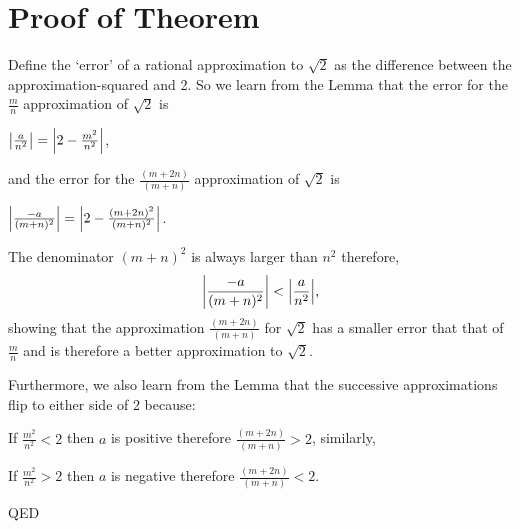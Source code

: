 \documentclass{article}
\DeclarePairedDelimiter\abs{\lvert}{\rvert}
\begin{document}
\section*{Proof of Theorem}
Define the `error' of a rational approximation to $\sqrt{2}$ as the difference between the
approximation-squared and 2.
So we learn from the Lemma that the error for the $\frac{m}{n}$ approximation of $\sqrt{2}$ is\newline
\centerline{$\abs*{\frac{a}{n^2}} = \abs*{2 - \frac{m^2}{n^2}}$,}

and the error for the $\frac{(m+2n)}{(m+n)}$ approximation of $\sqrt{2}$ is\newline
\centerline{$\abs*{\frac{-a}{(m+n)^2}} = \abs*{2 - \frac{(m+2n)^2}{(m+n)^2}}$.}

\bigskip
The denominator $(m+n)^2$ is always larger than $n^2$ therefore,
\[\abs*{\frac{-a}{(m+n)^2}} < \abs*{\frac{a}{n^2}} \text{,}\]
showing that the approximation $\frac{(m+2n)}{(m+n)}$ for
$\sqrt{2}$ 
has a smaller error that that of $\frac{m}{n}$ and is therefore
a better approximation to $\sqrt{2}$.

Furthermore, we also learn from the Lemma that the successive approximations flip
to either side of 2 because:

If $\frac{m^2}{n^2} < 2$ then $a$ is positive therefore $\frac{(m+2n)}{(m+n)} > 2$, similarly,

If $\frac{m^2}{n^2} > 2$ then $a$ is negative therefore $\frac{(m+2n)}{(m+n)} < 2$.

\bigskip
\hspace*{\fill}QED
\end{document}
